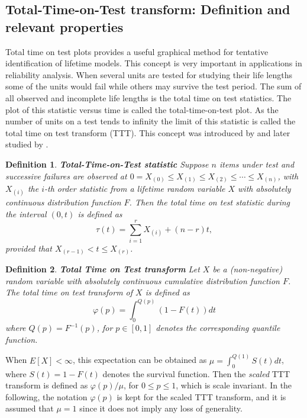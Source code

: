 \documentclass[preprint,12pt]{elsarticle}
\newtheorem{dfn}{{\sc Definition}}[section]
\begin{document}
\subsection{Total-Time-on-Test transform: Definition and relevant properties} \label{sec:TTT}
Total time on test plots provides a useful graphical method for tentative identification of lifetime models. This concept is very important in applications in reliability analysis. When several units are tested for studying their life lengths some of the units would fail while others may survive the test period. The sum of all observed and incomplete life lengths is the total time on test statistics. The plot of this statistic versus time is called the total-time-on-test plot. As the number of units on a test tends to infinity the limit of this statistic is called the total time on test transform (TTT). This concept was introduced by \cite{BD72} and later studied by \cite{BP75}.%

\begin{dfn} \textbf{Total-Time-on-Test statistic} \label{ttt.def1}
\noindent Suppose $n$ items under test and successive failures are observed at $0=X_{(0)} \leq X_{(1)} \leq X_{(2)}\leq \cdots \leq X_{(n)}$, with $X_{(i)}$ the $i$-th order statistic from a lifetime random variable $X$ with absolutely continuous distribution function $F$. Then the \textit{total time on test statistic} during the interval $(0,t)$ is defined as 
\[
\tau (t) = \sum_{i=1}^r X_{(i)}+\left(n-r\right)t,
\]
provided that $X_{(r-1)}<t\leq X_{(r)}$.
\end{dfn}


\begin{dfn}\textbf{Total Time on Test transform} \label{ttt.def2} 
\noindent Let $X$ be a (non-negative) random variable with absolutely continuous cumulative distribution function $F$. The \textit{total time on test transform} of $X$ is defined as
\begin{equation} \label{ttt.curve}
\varphi(p) =\displaystyle{\int_0^{Q(p)}}\left(1-F(t)\right) dt
\end{equation}
where $Q(p)= F^{-1}(p)$, for $p\in [0,1]$ denotes the corresponding quantile function.
\end{dfn}
When $E[X] < \infty$, this expectation can be obtained as $\mu=\int_0^{Q(1)} S(t)dt$, where $S(t)=1-F(t)$ denotes the survival function. Then the {\textit{scaled}} TTT transform is defined as $\varphi(p)/\mu$, for $0 \leq p \leq 1$,  which is scale invariant. In the following, the notation $\varphi(p)$ is kept for the scaled TTT transform, and it is assumed that $\mu=1$ since it does not imply any loss of generality.
\end{document}
